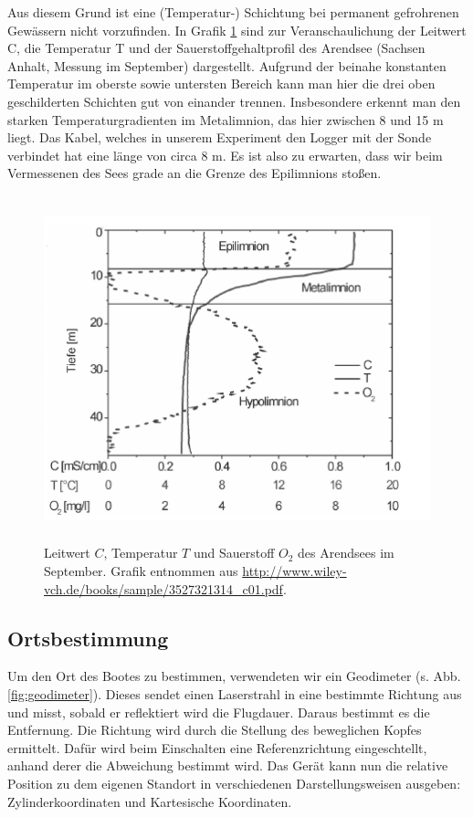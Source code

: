 \documentclass[12pt,a4paper,titlepage,headinclude,bibtotoc]{scrartcl}
\begin{document}
Aus diesem Grund ist eine (Temperatur-) Schichtung bei permanent gefrohrenen Gewässern nicht vorzufinden.
\newline
In Grafik \ref{fig:schichtung} sind zur Veranschaulichung der Leitwert C, die Temperatur T und der Sauerstoffgehaltprofil des Arendsee (Sachsen Anhalt, Messung im September) dargestellt. 
Aufgrund der beinahe konstanten Temperatur im oberste sowie untersten Bereich kann man hier die drei oben geschilderten Schichten gut von einander trennen. Insbesondere erkennt man den starken Temperaturgradienten im Metalimnion, das hier zwischen 8 und 15 m liegt. 
Das Kabel, welches in unserem Experiment den Logger mit der Sonde verbindet hat eine länge von circa 8 m. Es ist also zu erwarten, dass wir beim Vermessenen des Sees grade an die Grenze des Epilimnions stoßen.


\begin{figure}[h]
	\centering
	\includegraphics[height=10cm]{schicht.png}
	\caption{Leitwert $C$, Temperatur $T$ und Sauerstoff $O_2$ des Arendsees im September. Grafik entnommen aus \url{http://www.wiley-vch.de/books/sample/3527321314_c01.pdf}.}
	\label{fig:schichtung}
\end{figure}



\subsection{Ortsbestimmung}
\label{sec:theoort}
Um den Ort des Bootes zu bestimmen, verwendeten wir ein Geodimeter (s. Abb. \ref{fig:geodimeter}).
Dieses sendet einen Laserstrahl in eine bestimmte Richtung aus und misst, sobald er reflektiert wird die Flugdauer.
Daraus bestimmt es die Entfernung.
Die Richtung wird durch die Stellung des beweglichen Kopfes ermittelt.
Dafür wird beim Einschalten eine Referenzrichtung eingeschtellt, anhand derer die Abweichung bestimmt wird.
Das Gerät kann nun die relative Position zu dem eigenen Standort in verschiedenen Darstellungsweisen ausgeben: Zylinderkoordinaten und Kartesische Koordinaten.
\end{document}
